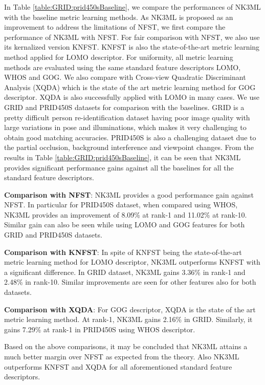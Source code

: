 \documentclass[runningheads]{llncs}
\begin{document}
In Table \ref{table:GRID:prid450sBaseline}, we compare the performances of NK3ML with the baseline metric learning methods. As NK3ML is proposed as an  improvement to address the limitations of NFST, we first compare the performance of NK3ML with NFST. For fair comparison with NFST, we also use its kernalized version KNFST\cite{Zheng:nfst}. KNFST is also the state-of-the-art metric learning method applied for LOMO descriptor. For uniformity, all metric learning methods are evaluated using the same standard feature descriptors LOMO\cite{LOMO}, WHOS\cite{LisantiPAMI14} and GOG\cite{GOG}.
 We also compare with Cross-view Quadratic Discriminant Analysis (XQDA)\cite{GOG} which is the state of the art metric learning method for GOG descriptor. XQDA is also successfully applied with LOMO in many cases\cite{LOMO}. We use GRID and PRID450S datasets for comparison with the baselines. GRID is a pretty difficult person re-identification dataset having poor image quality with large variations in pose and illuminations, which makes it very challenging to obtain good matching accuracies. PRID450S is also a challenging dataset due to the partial occlusion, background interference and viewpoint changes. From the results in Table \ref{table:GRID:prid450sBaseline}, it can be seen that NK3ML provides significant performance gains against all the baselines for all the standard feature descriptors.



\setlength{\parskip}{0.5mm}
\noindent\textbf{Comparison with NFST}: NK3ML provides a good performance gain against NFST. In particular for PRID450S dataset, when compared using WHOS, NK3ML provides an improvement of 8.09\% at rank-1 and 11.02\% at rank-10.
Similar gain can also be seen while using LOMO and GOG features for both GRID and PRID450S datasets.

\noindent\textbf{Comparison with KNFST}: In spite of KNFST being the state-of-the-art metric learning method for LOMO descriptor, NK3ML outperforms KNFST with a significant difference. In GRID dataset, NK3ML gains 3.36\% in rank-1
and 2.48\% in rank-10.
Similar improvements are seen for other features also for both datasets.

\noindent\textbf{Comparison with XQDA}: For GOG descriptor, XQDA is the state of the art metric learning method. At rank-1, NK3ML gains 2.16\% in GRID.
Similarly, it gains 7.29\% at rank-1 in PRID450S using WHOS descriptor.


\setlength{\parskip}{0mm}
Based on the above comparisons, it may be concluded that NK3ML attains a much better margin over NFST as expected from the theory.  Also NK3ML outperforms KNFST and XQDA for all aforementioned standard feature descriptors.
\end{document}
